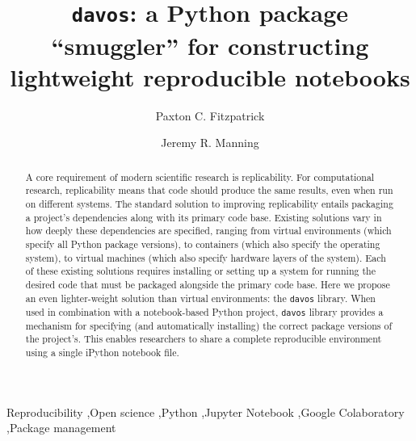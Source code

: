 \documentclass[preprint,12pt, a4paper]{elsarticle}
\begin{document}
\begin{frontmatter}

\title{\texttt{davos}: a Python package ``smuggler'' for constructing
  lightweight reproducible notebooks}
\author{Paxton C. Fitzpatrick}
\author{Jeremy R. Manning}
\address{Department of Psychological and Brain Sciences\\Dartmouth College, Hanover, NH 03755}


\begin{abstract}

A core requirement of modern scientific research is replicability.
For computational research, replicability means that code should
produce the same results, even when run on different systems.  The
standard solution to improving replicability entails packaging a
project's dependencies along with its primary code base.  Existing
solutions vary in how deeply these dependencies are specified, ranging
from virtual environments (which specify all Python package versions),
to containers (which also specify the operating system), to
virtual machines (which also specify hardware layers of the system).
Each of these existing solutions requires installing or setting up a
system for running the desired code that must be packaged alongside
the primary code base.  Here we propose an even lighter-weight
solution than virtual environments: the \texttt{davos} library.  When
used in combination with a notebook-based Python project, \texttt{davos}
library provides a mechanism for specifying (and automatically
installing) the correct package versions of the project's.  This
enables researchers to share a complete reproducible environment using
a single iPython notebook file.

\end{abstract}


\begin{keyword}
Reproducibility \sep Open science \sep Python \sep Jupyter Notebook \sep Google Colaboratory \sep Package management
\end{keyword}

\end{frontmatter}


\end{document}
